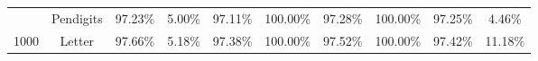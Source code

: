 \begin{table}[thbp]
{\begin{tabular}{cc|cc|cc|cc|cc}
                            & Pendigits                 & 97.23\%        & 5.00\%         & 97.11\%         & 100.00\%         & 97.28\%                    & 100.00\%                    & 97.25\%          & 4.46\%           \\
\multirow{-3}{*}{1000}      & Letter                    & 97.66\%        & 5.18\%         & 97.38\%         & 100.00\%         & 97.52\%                    & 100.00\%                    & 97.42\%          & 11.18\%         \\
\midrule
\bottomrule
\end{tabular}%
}
\end{table}